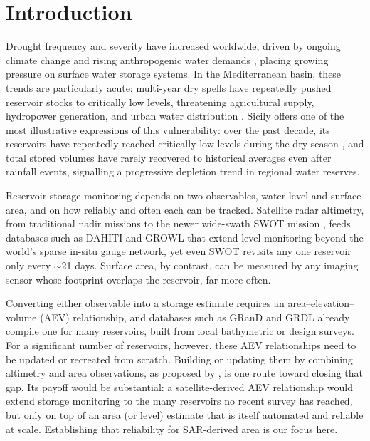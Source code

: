 \section{Introduction}
\label{sec:introduction}

Drought frequency and severity have increased worldwide, driven by
ongoing climate change and rising anthropogenic water demands
\citep{IPCC2023, Pokhrel2021}, placing growing pressure on surface water
storage systems. In the Mediterranean basin, these trends are particularly
acute: multi-year dry spells have repeatedly pushed reservoir stocks to
critically low levels, threatening agricultural supply, hydropower
generation, and urban water distribution \citep{Cammalleri2022,
Bevacqua2023}. Sicily offers one of the most illustrative expressions of
this vulnerability: over the past decade, its reservoirs have repeatedly
reached critically low levels during the dry season \citep{ISPRA2023},
and total stored volumes have rarely recovered to historical averages even
after rainfall events, signalling a progressive depletion trend in
regional water reserves.

Reservoir storage monitoring depends on two observables, water level and
surface area, and on how reliably and often each can be tracked. Satellite
radar altimetry, from traditional nadir missions to the newer wide-swath
SWOT mission \citep{Biancamaria2016}, feeds databases such as DAHITI
\citep{Schwatke2015} and GROWL \citep{Zhang2026} that extend level monitoring
beyond the world's sparse in-situ gauge network, yet even SWOT revisits any
one reservoir only every $\sim$21 days. Surface area, by contrast, can be
measured by any imaging sensor whose footprint overlaps the reservoir, far
more often.

Converting either observable into a storage estimate requires an
area--elevation--volume (AEV) relationship, and databases such as GRanD
\citep{Lehner2011} and GRDL \citep{Hao2024} already compile one for many
reservoirs, built from local bathymetric or design surveys. For a
significant number of reservoirs, however, these AEV relationships need to
be updated or recreated from scratch. Building or updating them by
combining altimetry and area observations, as proposed by
\citet{Schwatke2020}, is one route toward closing that gap. Its payoff
would be substantial: a satellite-derived AEV relationship would extend
storage monitoring to the many reservoirs no recent survey has reached,
but only on top of an area (or level) estimate that is itself automated
and reliable at scale. Establishing that reliability for SAR-derived area
is our focus here.

